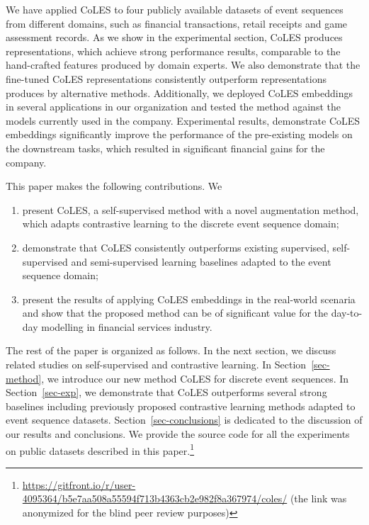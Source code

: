 \documentclass[sigconf, anonymous]{acmart}
\begin{document}
We have applied CoLES to four publicly available datasets of event sequences from different
domains, such as financial transactions, retail receipts and game assessment records. As we
show in the experimental section, CoLES produces representations, which achieve strong
performance results, comparable to the hand-crafted features produced by domain experts.
We also demonstrate that the fine-tuned CoLES representations consistently outperform
representations produces by alternative methods.
%
%
Additionally, we deployed CoLES embeddings in several applications in our organization and tested
the method against the models currently used in the company. Experimental results, demonstrate
CoLES embeddings significantly improve the performance of the pre-existing models on the downstream
tasks, which resulted in significant financial gains for the company.

This paper makes the following contributions. We
\begin{enumerate}
    \item present CoLES, a self-supervised method with a novel augmentation method, which adapts
    contrastive learning to the discrete event sequence domain;

    \item demonstrate that CoLES consistently outperforms existing supervised, self-supervised and
    semi-supervised learning baselines adapted to the event sequence domain;

    \item present the results of applying CoLES embeddings in the real-world scenaria and show
    that the proposed method can be of significant value for the day-to-day modelling in financial
    services industry.
\end{enumerate}

The rest of the paper is organized as follows. In the next section, we discuss related studies
on self-supervised and contrastive learning. In Section~\ref{sec-method}, we introduce our new
method CoLES for discrete event sequences. In Section~\ref{sec-exp}, we demonstrate that CoLES
outperforms several strong baselines including previously proposed contrastive learning methods
adapted to event sequence datasets. Section~\ref{sec-conclusions} is dedicated to the discussion
of our results and conclusions.
% 
We provide the source code for all the experiments on public datasets described in this paper.\footnote{
    \url{https://gitfront.io/r/user-4095364/b5e7aa508a55594f713b4363cb2e982f8a367974/coles/}
    (the link was anonymized for the blind peer review purposes)
}
\end{document}

